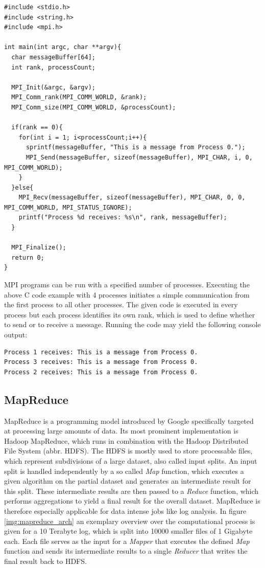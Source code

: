 \begin{lstlisting}[caption=MPI Code Example,captionpos=b]
#include <stdio.h>
#include <string.h>
#include <mpi.h>

int main(int argc, char **argv){
  char messageBuffer[64];
  int rank, processCount;

  MPI_Init(&argc, &argv);
  MPI_Comm_rank(MPI_COMM_WORLD, &rank);
  MPI_Comm_size(MPI_COMM_WORLD, &processCount);

  if(rank == 0){
    for(int i = 1; i<processCount;i++){
      sprintf(messageBuffer, "This is a message from Process 0.");
      MPI_Send(messageBuffer, sizeof(messageBuffer), MPI_CHAR, i, 0, MPI_COMM_WORLD);
    }
  }else{
    MPI_Recv(messageBuffer, sizeof(messageBuffer), MPI_CHAR, 0, 0, MPI_COMM_WORLD, MPI_STATUS_IGNORE);
    printf("Process %d receives: %s\n", rank, messageBuffer);
  }

  MPI_Finalize();
  return 0;
}
\end{lstlisting}

MPI programs can be run with a specified number of processes. Executing the above C code example with 4 processes initiates a simple communication from the first process to all other processes. The given code is executed in every process but each process identifies its own rank, which is used to define whether to send or to receive a message. Running the code may yield the following console output:
\begin{Verbatim}[fontsize=\small]
Process 1 receives: This is a message from Process 0.
Process 3 receives: This is a message from Process 0.
Process 2 receives: This is a message from Process 0.
\end{Verbatim}

\subsection*{MapReduce}
MapReduce is a programming model introduced by Google specifically targeted at processing large amounts of data\cite{mapreduce}. Its most prominent implementation is Hadoop MapReduce, which runs in combination with the Hadoop Distributed File System (abbr. HDFS). The HDFS is mostly used to store processable files, which represent subdivisions of a large dataset, also called input splits. An input split is handled independently by a so called \textit{Map} function, which executes a given algorithm on the partial dataset and generates an intermediate result for this split. These intermediate results are then passed to a \textit{Reduce} function, which performs aggregations to yield a final result for the overall dataset. MapReduce is therefore especially applicable for data intense jobs like log analysis. In figure \ref{img:mapreduce_arch} an exemplary overview over the computational process is given for a 10 Terabyte log, which is split into 10000 smaller files of 1 Gigabyte each. Each file serves as the input for a \textit{Mapper} that executes the defined \textit{Map} function and sends its intermediate results to a single \textit{Reducer} that writes the final result back to HDFS.

